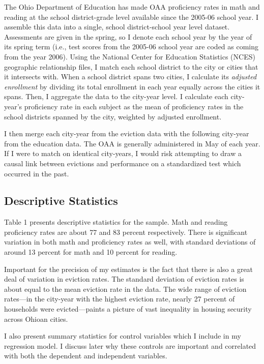 \documentclass[12pt]{article}
\begin{document}
The Ohio Department of Education has made OAA proficiency rates in math and reading at the school district-grade level available since the 2005-06 school year. I assemble this data into a single, school district-school year level dataset. Assessments are given in the spring, so I denote each school year by the year of its spring term (i.e., test scores from the 2005-06 school year are coded as coming from the year 2006). Using the National Center for Education Statistics (NCES) geographic relationship files, I match each school district to the city or cities that it intersects with. When a school district spans two cities, I calculate its \textit{adjusted enrollment} by dividing its total enrollment in each year equally across the cities it spans. Then, I aggregate the data to the city-year level. I calculate each city-year's proficiency rate in each subject as the mean of proficiency rates in the school districts spanned by the city, weighted by adjusted enrollment.

I then merge each city-year from the eviction data with the following city-year from the education data. The OAA is generally administered in May of each year. If I were to match on identical city-years, I would risk attempting to draw a causal link between evictions and performance on a standardized test which occurred in the past.


\subsection{Descriptive Statistics}
Table 1 presents descriptive statistics for the sample. Math and reading proficiency rates are about 77 and 83 percent respectively. There is significant variation in both math and proficiency rates as well, with standard deviations of around 13 percent for math and 10 percent for reading.

Important for the precision of my estimates is the fact that there is also a great deal of variation in eviction rates. The standard deviation of eviction rates is about equal to the mean eviction rate in the data. The wide range of  eviction rates—in the city-year with the highest eviction rate, nearly 27 percent of households were evicted—paints a picture of vast inequality in housing security across Ohioan cities.

I also present summary statistics for control variables which I include in my regression model. I discuss later why these controls are important and correlated with both the dependent and independent variables.
\end{document}
